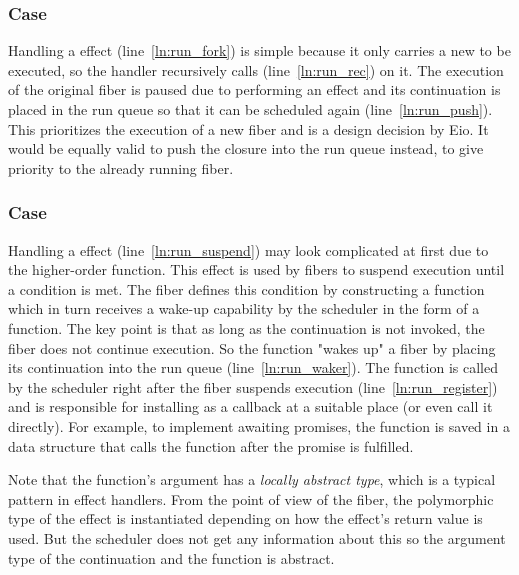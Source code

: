 \subsubsection*{\efork{} Case}
Handling a \efork{} effect (line~\ref{ln:run_fork}) is simple because it only carries a new  to be executed, so the handler recursively calls  (line~\ref{ln:run_rec}) on it.
The execution of the original fiber is paused due to performing an effect and its continuation  is placed in the run queue so that it can be scheduled again (line~\ref{ln:run_push}).
This prioritizes the execution of a new fiber and is a design decision by Eio.
It would be equally valid to push the closure  into the run queue instead, to give priority to the already running fiber.

\subsubsection*{\esuspend{} Case}
Handling a \esuspend{} effect (line~\ref{ln:run_suspend}) may look complicated at first due to the higher-order  function.
This effect is used by fibers to suspend execution until a condition is met.
The fiber defines this condition by constructing a  function which in turn receives a wake-up capability by the scheduler in the form of a  function.
The key point is that as long as the continuation  is not invoked, the fiber does not continue execution.
So the  function "wakes up" a fiber by placing its continuation  into the run queue (line~\ref{ln:run_waker}).
The  function is called by the scheduler right after the fiber suspends execution (line~\ref{ln:run_register}) and is responsible for installing  as a callback at a suitable place (or even call it directly).
For example, to implement awaiting promises, the  function is saved in a data structure that calls the function after the promise is fulfilled.

Note that the  function's argument  has a \emph{locally abstract type}, which is a typical pattern in effect handlers.
From the point of view of the fiber, the polymorphic type  of the \esuspend{} effect is instantiated depending on how the effect's return value is used.
But the scheduler does not get any information about this so the argument type of the continuation  and the  function is abstract.

